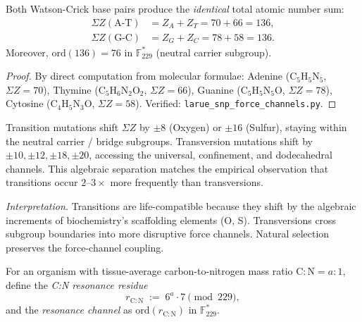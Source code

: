 \begin{theorem}
\label{thm:wc_identity}
Both Watson-Crick base pairs produce the \emph{identical} total atomic number sum:
\begin{align}
  \Sigma Z(\text{A-T}) &= Z_A + Z_T = 70 + 66 = 136, \\
  \Sigma Z(\text{G-C}) &= Z_G + Z_C = 78 + 58 = 136.
\end{align}
Moreover, $\mathrm{ord}(136) = 76$ in $\mathbb{F}_{229}^*$ (neutral carrier subgroup).
\begin{proof}
By direct computation from molecular formulae: Adenine ($\mathrm{C}_5\mathrm{H}_5\mathrm{N}_5$,
$\Sigma Z = 70$), Thymine ($\mathrm{C}_5\mathrm{H}_6\mathrm{N}_2\mathrm{O}_2$,
$\Sigma Z = 66$), Guanine ($\mathrm{C}_5\mathrm{H}_5\mathrm{N}_5\mathrm{O}$,
$\Sigma Z = 78$), Cytosine ($\mathrm{C}_4\mathrm{H}_5\mathrm{N}_3\mathrm{O}$,
$\Sigma Z = 58$). Verified: \texttt{larue\_snp\_force\_channels.py}.
\qedhere
\end{proof}
\end{theorem}

\begin{result}
\label{res:transition}
Transition mutations shift $\Sigma Z$ by $\pm 8$ (Oxygen) or $\pm 16$ (Sulfur),
staying within the neutral carrier / bridge subgroups. Transversion mutations
shift by $\pm 10, \pm 12, \pm 18, \pm 20$, accessing the universal, confinement,
and dodecahedral channels. This algebraic separation matches the empirical
observation that transitions occur $2$--$3\times$ more frequently than transversions.

\emph{Interpretation.} Transitions are life-compatible because they shift by the
algebraic increments of biochemistry's scaffolding elements (O, S).
Transversions cross subgroup boundaries into more disruptive force channels.
Natural selection preserves the force-channel coupling.
\end{result}

\begin{definition}
\label{def:cn_resonance}
For an organism with tissue-average carbon-to-nitrogen mass ratio $\mathrm{C:N} = a:1$,
define the \emph{C:N resonance residue}
\begin{equation}
  r_{\mathrm{C:N}} \;:=\; 6^a \cdot 7 \pmod{229},
\end{equation}
and the \emph{resonance channel} as $\mathrm{ord}(r_{\mathrm{C:N}})$ in $\mathbb{F}_{229}^*$.
\end{definition}


